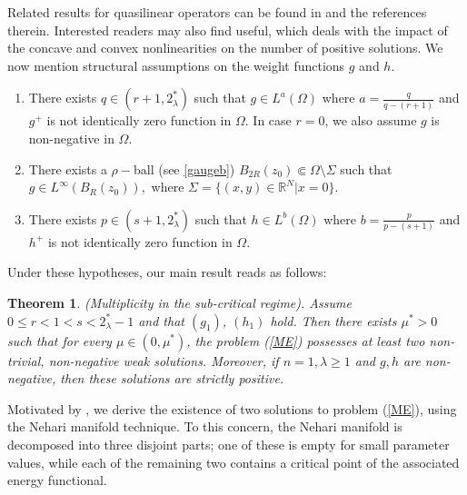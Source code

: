 \documentclass[12pt, notitlepage]{article}
\def\R{\mathbb{R}}
\newtheorem{theorem}{Theorem}[section]
\begin{document}
{Related results for quasilinear operators can be found in \cite{Adi1, BN, Pavel} and the references therein. Interested readers may also find \cite{ Michel, DE} useful, which deals with the impact of the concave and convex nonlinearities on the number of positive solutions.
We now mention structural assumptions on the weight functions $g$ and $h$.
\begin{enumerate}
    \item[($g_1$)] There exists $q\in(r+1, 2^*_\lambda)$ such that $g\in L^a(\Omega)$ where $a=\frac{q}{q-(r+1)}$ and $g^+$ is not identically zero function in $\Omega$. In case $r=0$, we also assume $g$ is non-negative in $\Omega$.
    \item[($g_2$)] There exists a $\rho-$ball (see \ref{gaugeb}) $B_{2R}(z_0)\Subset\Omega\setminus\Sigma$ such that $g\in L^\infty(B_R(z_0)),$ where $\Sigma =\{(x,y)\in\R^N| x=0\}.$
    \item[($h_1$)] There exists $p\in(s+1, 2^*_\lambda)$ such that $h\in L^b(\Omega)$ where $b=\frac{p}{p-(s+1)}$ and $h^+$ is not identically zero function in $\Omega$.
\end{enumerate}
Under these hypotheses, our main result reads as follows:
\begin{theorem}\label{MT1}(Multiplicity in the sub-critical regime).
    Assume $0\leq r<1<s<2^*_\lambda-1$ and that $(g_1)$, $(h_1)$ hold. Then there exists $\mu^*>0$ such that for every $\mu\in(0,\mu^*)$, the problem (\ref{ME}) possesses at least two non-trivial, non-negative weak solutions. Moreover, if $n=1,\lambda\geq 1$ and $g,h$ are non-negative, then these solutions are strictly positive.
\end{theorem}
 Motivated by \cite{WU1, WU}, we derive the existence of two solutions to problem (\ref{ME}), using the Nehari manifold technique. To this concern, the Nehari manifold is decomposed into three disjoint parts; one of these is empty for small parameter values, while each of the remaining two contains a critical point of the associated energy functional.
 
}
\end{document}
